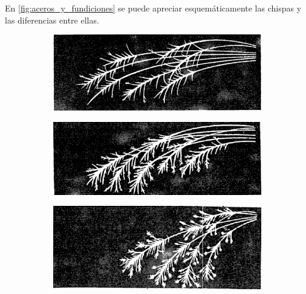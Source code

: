 \documentclass[12pt,a4paper]{article}
\begin{document}
En \autoref{fig:aceros_y_fundiciones} se puede apreciar esquemáticamente las chispas y las diferencias entre ellas.

\begin{figure}[h!]
    \centering
    \begin{subfigure}{0.45\textwidth}
        \centering
        \includegraphics[width=\textwidth]{Figuras/0,32.png}
        \label{fig:0,32}

        \includegraphics[width=\textwidth]{Figuras/0,42.png}
        \label{fig:0,42}
    
        \includegraphics[width=\textwidth]{Figuras/1,05.png}
        \label{fig:1,05}
    

\end{subfigure}
\end{figure}
\end{document}

